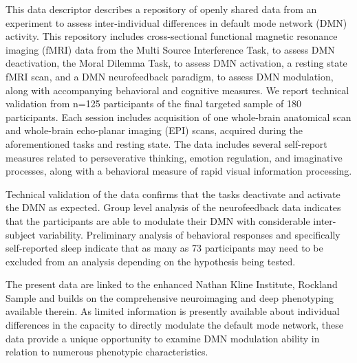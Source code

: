 This data descriptor describes a repository of openly shared data from an experiment to assess inter-individual differences in default mode network (DMN) activity. This repository includes cross-sectional functional magnetic resonance imaging (fMRI) data from the Multi Source Interference Task, to assess DMN deactivation, the Moral Dilemma Task, to assess DMN activation, a resting state fMRI scan, and a DMN neurofeedback paradigm, to assess DMN modulation, along with accompanying behavioral and cognitive measures. We report technical validation from n=125 participants of the final targeted sample of 180 participants. Each session includes acquisition of one whole-brain anatomical scan and whole-brain echo-planar imaging (EPI) scans, acquired during the aforementioned tasks and resting state. The data includes several self-report measures related to perseverative thinking, emotion regulation, and imaginative processes, along with a behavioral measure of rapid visual information processing. 

Technical validation of the data confirms that the tasks deactivate and activate the DMN as expected. Group level analysis of the neurofeedback data indicates that the participants are able to modulate their DMN with considerable inter-subject variability. Preliminary analysis of behavioral responses and specifically self-reported sleep indicate that as many as 73 participants may need to be excluded from an analysis depending on the hypothesis being tested. 

The present data are linked to the enhanced Nathan Kline Institute, Rockland Sample and builds on the comprehensive neuroimaging and deep phenotyping available therein. As limited information is presently available about individual differences in the capacity to directly modulate the default mode network, these data provide a unique opportunity to examine DMN modulation ability in relation to numerous phenotypic characteristics. 